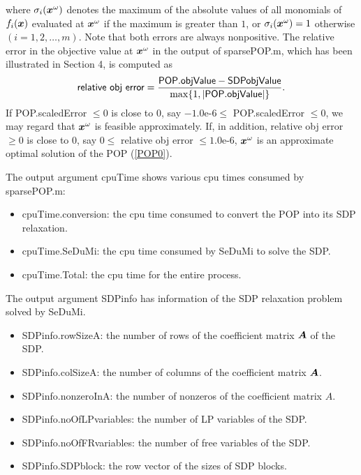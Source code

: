 where $\sigma_i(\x^{\omega})$ denotes the maximum of the absolute values 
of all monomials 
of $f_i(\x)$ evaluated at $\x^{\omega}$ if the maximum is greater than $1$, 
or $\sigma_i(\x^{\omega}) = 1$ otherwise $(i=1,2,\ldots,m)$. 
Note that both errors are always nonpositive. 
The relative error in the objective value at $\x^{\omega}$ in the output of sparsePOP.m, 
which has been illustrated in Section 4,  is computed as 
\[
\mbox{{\sf   relative obj error}} = \frac{{\sf POP.objValue} - {\sf SDPobjValue}}{\max \{ 1, |{\sf POP.objValue}| \}}. 
\]
If {\sf POP.scaledError} $\leq 0$ is close to $0$, say $-1.0$e-$6 \leq $  {\sf POP.scaledError} $\leq 0$, 
we may regard that $\x^{\omega}$ is feasible approximately. If, in addition, 
{\sf   relative obj error} $ \geq 0$ is close to $0$, say $0 \leq $ {\sf   relative obj error} $\leq 1.0$e-$6$, 
$\x^{\omega}$ is an approximate optimal solution of the POP (\ref{POP0}). 

The output argument {\sf cpuTime} shows various cpu times consumed by 
 sparsePOP.m:
\begin{itemize}
\item  {\sf cpuTime.conversion}: 
the cpu time consumed to convert the POP into its SDP relaxation. 
\item {\sf cpuTime.SeDuMi}: the cpu time consumed by SeDuMi to solve the SDP.
\item {\sf cpuTime.Total}: the cpu time for the entire process.
\end{itemize}

The output argument {\sf SDPinfo} has information of the SDP relaxation problem solved 
by SeDuMi.
\begin{itemize}
\item {\sf SDPinfo.rowSizeA}:
the number of rows  of the coefficient matrix $\A$ of the SDP.  
\item {\sf SDPinfo.colSizeA}:
the number of  columns of the coefficient matrix $\A$. %
\item {\sf SDPinfo.nonzeroInA}: the number of nonzeros of the 
coefficient matrix $A$.
\item {\sf SDPinfo.noOfLPvariables}:
the number of LP variables of the SDP.
\item {\sf SDPinfo.noOfFRvariables}: the number of free variables of the SDP. 
\item {\sf   SDPinfo.SDPblock}:
the row vector of the sizes of SDP blocks.
\end{itemize}

